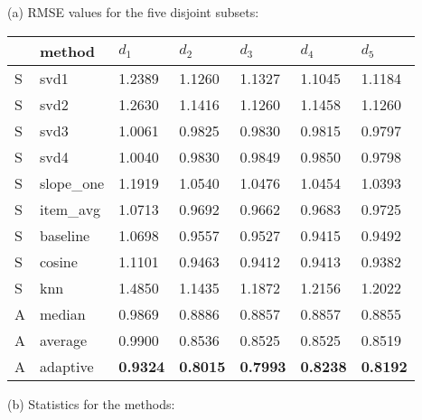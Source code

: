 \begin{table}
  
  \centering
  \tiny
  (a) RMSE values for the five disjoint subsets:

  \vspace{0.4em}

  \begin{tabular*}{0.9\textwidth}{ l l l l l l l }
    \hline
    { } & method & $d_1$ & $d_2$ & $d_3$ & $d_4$ & $d_5$ \\ 
    \hline
    S & svd1          & 1.2389	  & 1.1260	  & 1.1327	  & 1.1045	  & 1.1184	 \\
    S & svd2          & 1.2630	  & 1.1416    & 1.1260	  & 1.1458	  & 1.1260	 \\
    S & svd3          & 1.0061	  & 0.9825	  & 0.9830	  & 0.9815	  & 0.9797	 \\
    S & svd4          & 1.0040	  & 0.9830	  & 0.9849	  & 0.9850	  & 0.9798	 \\
    S & slope\_one    & 1.1919	  & 1.0540	  & 1.0476	  & 1.0454	  & 1.0393   \\
    S & item\_avg     & 1.0713	  & 0.9692	  & 0.9662	  & 0.9683	  & 0.9725	 \\
    S & baseline       & 1.0698	  & 0.9557	  & 0.9527	  & 0.9415	  & 0.9492	 \\
    S & cosine   	    & 1.1101	  & 0.9463	  & 0.9412	  & 0.9413	  & 0.9382	 \\
    S & knn       	  & 1.4850	  & 1.1435	  & 1.1872    & 1.2156	  & 1.2022	 \\
    \hline                                                                    
    A & median    	  & 0.9869	  & 0.8886	  & 0.8857    & 0.8857	  & 0.8855	 \\
    A & average    	  & 0.9900	  & 0.8536	  & 0.8525	  & 0.8525	  & 0.8519	 \\
    A & adaptive       & \textbf{0.9324}	  & \textbf{0.8015}	  & \textbf{0.7993}  & \textbf{0.8238} & \textbf{0.8192} \\
    \hline
  \end{tabular*}

  \vspace{1em}
  
  (b) Statistics for the methods:

  \vspace{0.4em}


\end{table}

